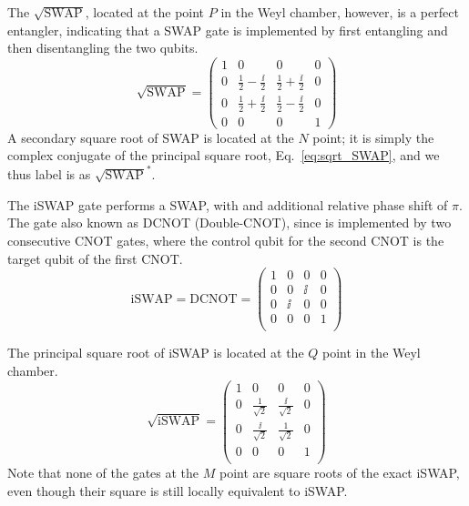   The $\sqrt{\text{SWAP}}$, located at the point $P$ in the Weyl chamber,
  however, is a perfect entangler, indicating that
  a SWAP gate is implemented by first entangling and then disentangling the two
  qubits.
  \begin{equation}
  \sqrt{\text{SWAP}}=
    \begin{pmatrix}
    1 & 0 & 0 & 0 \\
    0 & \frac{1}{2}-\frac{\ii}{2} & \frac{1}{2}+\frac{\ii}{2} & 0 \\
    0 & \frac{1}{2}+\frac{\ii}{2} & \frac{1}{2}-\frac{\ii}{2} & 0 \\
    0 & 0 & 0 & 1
    \end{pmatrix}
    \label{eq:sqrt_SWAP}
  \end{equation}
  A secondary square root of SWAP is located at the $N$ point; it is simply
  the complex conjugate of the principal square root, Eq.~\eqref{eq:sqrt_SWAP},
  and we thus label is as $\sqrt{\text{SWAP}}^*$.

  The iSWAP gate performs a SWAP, with and additional relative phase shift
  of $\pi$. The gate also known  as DCNOT (Double-CNOT), since is
  implemented by two consecutive CNOT gates, where the control qubit for the
  second CNOT is the target qubit of the first CNOT.
  \begin{equation}
  \text{iSWAP} =  \text{DCNOT} =
    \begin{pmatrix}
    1 & 0 & 0 & 0 \\
    0 & 0 & \ii & 0 \\
    0 & \ii & 0 & 0 \\
    0 & 0 & 0 & 1 \\
    \end{pmatrix}
  \end{equation}

  The principal square root of iSWAP is located at the $Q$ point in the Weyl
  chamber.
  \begin{equation}
  \sqrt{\text{iSWAP}} =
    \begin{pmatrix}
    1 & 0 & 0 & 0 \\
    0 & \frac{1}{\sqrt{2}} & \frac{\ii}{\sqrt{2}} & 0 \\
    0 & \frac{\ii}{\sqrt{2}} & \frac{1}{\sqrt{2}} & 0 \\
    0 & 0 & 0 & 1 \\
    \end{pmatrix}
  \end{equation}
  Note that none of the gates at the $M$ point are square roots of the exact
  iSWAP, even though their square is still locally equivalent to iSWAP.


